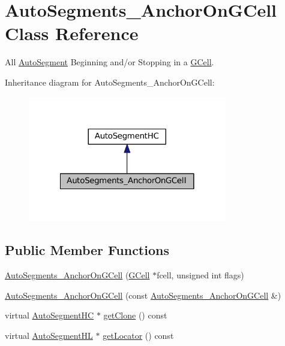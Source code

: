 \hypertarget{classKatabatic_1_1AutoSegments__AnchorOnGCell}{}\section{Auto\+Segments\+\_\+\+Anchor\+On\+G\+Cell Class Reference}
\label{classKatabatic_1_1AutoSegments__AnchorOnGCell}


All \mbox{\hyperlink{classKatabatic_1_1AutoSegment}{Auto\+Segment}} Beginning and/or Stopping in a \mbox{\hyperlink{classKatabatic_1_1GCell}{G\+Cell}}.  




Inheritance diagram for Auto\+Segments\+\_\+\+Anchor\+On\+G\+Cell\+:\nopagebreak
\begin{figure}[H]
\begin{center}
\leavevmode
\includegraphics[width=246pt]{classKatabatic_1_1AutoSegments__AnchorOnGCell__inherit__graph}
\end{center}
\end{figure}
\subsection*{Public Member Functions}
\begin{DoxyCompactItemize}
\item 
\mbox{\hyperlink{classKatabatic_1_1AutoSegments__AnchorOnGCell_a41a8dace22db3bdd8ecbf1850344f885}{Auto\+Segments\+\_\+\+Anchor\+On\+G\+Cell}} (\mbox{\hyperlink{classKatabatic_1_1GCell}{G\+Cell}} $\ast$fcell, unsigned int flags)
\item 
\mbox{\hyperlink{classKatabatic_1_1AutoSegments__AnchorOnGCell_a4597cd793ef7f6a5be546b24863f99e8}{Auto\+Segments\+\_\+\+Anchor\+On\+G\+Cell}} (const \mbox{\hyperlink{classKatabatic_1_1AutoSegments__AnchorOnGCell}{Auto\+Segments\+\_\+\+Anchor\+On\+G\+Cell}} \&)
\item 
virtual \mbox{\hyperlink{namespaceKatabatic_acb3628dc7705fefe38a665cfe43efa6e}{Auto\+Segment\+HC}} $\ast$ \mbox{\hyperlink{classKatabatic_1_1AutoSegments__AnchorOnGCell_a5b26b0698bdcb40cbf51b250dfb21858}{get\+Clone}} () const
\item 
virtual \mbox{\hyperlink{namespaceKatabatic_a40ef13471fd0e797b75d3c436813fe65}{Auto\+Segment\+HL}} $\ast$ \mbox{\hyperlink{classKatabatic_1_1AutoSegments__AnchorOnGCell_a07665c070fcc269aec02ce842f384483}{get\+Locator}} () const
\end{DoxyCompactItemize}


